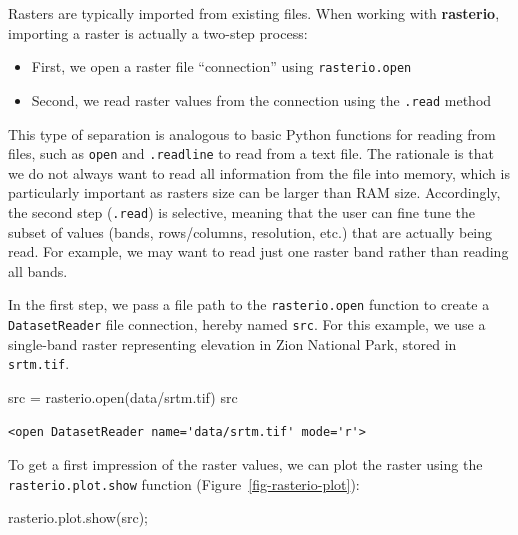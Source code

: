 \documentclass[
  letterpaper,
]{krantz}
\newenvironment{Shaded}{\begin{snugshade}}{\end{snugshade}}
\newcommand{\BuiltInTok}[1]{\textcolor[rgb]{0.00,0.23,0.31}{#1}}
\newcommand{\NormalTok}[1]{\textcolor[rgb]{0.00,0.23,0.31}{#1}}
\newcommand{\OperatorTok}[1]{\textcolor[rgb]{0.37,0.37,0.37}{#1}}
\newcommand{\StringTok}[1]{\textcolor[rgb]{0.13,0.47,0.30}{#1}}
\providecommand{\tightlist}{%
  \setlength{\itemsep}{0pt}\setlength{\parskip}{0pt}}\usepackage{longtable,booktabs,array}
\begin{document}
Rasters are typically imported from existing files. When working with
\textbf{rasterio}, importing a raster is actually a two-step process:

\begin{itemize}
\tightlist
\item
  First, we open a raster file ``connection'' using
  \texttt{rasterio.open}
\item
  Second, we read raster values from the connection using the
  \texttt{.read} method
\end{itemize}

This type of separation is analogous to basic Python functions for
reading from files, such as \texttt{open} and \texttt{.readline} to read
from a text file. The rationale is that we do not always want to read
all information from the file into memory, which is particularly
important as rasters size can be larger than RAM size. Accordingly, the
second step (\texttt{.read}) is selective, meaning that the user can
fine tune the subset of values (bands, rows/columns, resolution, etc.)
that are actually being read. For example, we may want to read just one
raster band rather than reading all bands.

In the first step, we pass a file path to the \texttt{rasterio.open}
function to create a \texttt{DatasetReader} file connection, hereby
named \texttt{src}. For this example, we use a single-band raster
representing elevation in Zion National Park, stored in
\texttt{srtm.tif}.

\begin{Shaded}
\begin{Highlighting}[]
\NormalTok{src }\OperatorTok{=}\NormalTok{ rasterio.}\BuiltInTok{open}\NormalTok{(}\StringTok{\textquotesingle{}data/srtm.tif\textquotesingle{}}\NormalTok{)}
\NormalTok{src}
\end{Highlighting}
\end{Shaded}

\begin{verbatim}
<open DatasetReader name='data/srtm.tif' mode='r'>
\end{verbatim}

To get a first impression of the raster values, we can plot the raster
using the \texttt{rasterio.plot.show} function
(Figure~\ref{fig-rasterio-plot}):

\begin{Shaded}
\begin{Highlighting}[]
\NormalTok{rasterio.plot.show(src)}\OperatorTok{;}
\end{Highlighting}
\end{Shaded}
\end{document}
